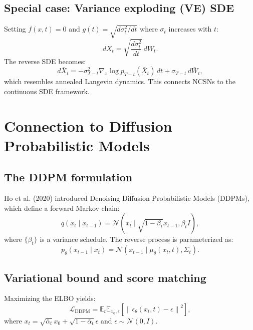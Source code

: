 \documentclass[11pt]{article}
\theoremstyle{definition}
\begin{document}
\subsection{Special case: Variance exploding (VE) SDE}
Setting $f(x,t) = 0$ and $g(t) = \sqrt{d\sigma_t^2/dt}$ where $\sigma_t$ increases with $t$:
\begin{equation}
dX_t = \sqrt{\frac{d\sigma_t^2}{dt}} \, dW_t.
\end{equation}
The reverse SDE becomes:
\begin{equation}
d\bar{X}_t = -\sigma_{T-t}^2 \nabla_x \log p_{T-t}(\bar{X}_t)\,dt + \sigma_{T-t}\, d\bar{W}_t,
\end{equation}
which resembles annealed Langevin dynamics. 
This connects NCSNs to the continuous SDE framework.

\section{Connection to Diffusion Probabilistic Models}

\subsection{The DDPM formulation}
Ho et al. (2020) introduced Denoising Diffusion Probabilistic Models (DDPMs), 
which define a forward Markov chain:
\begin{equation}
q(x_t \mid x_{t-1}) = \mathcal{N}(x_t \mid \sqrt{1-\beta_t}x_{t-1}, \beta_t I),
\end{equation}
where $\{\beta_t\}$ is a variance schedule. 
The reverse process is parameterized as:
\begin{equation}
p_\theta(x_{t-1} \mid x_t) = \mathcal{N}(x_{t-1} \mid \mu_\theta(x_t, t), \Sigma_t).
\end{equation}

\subsection{Variational bound and score matching}
Maximizing the ELBO yields:
\begin{equation}
\mathcal{L}_{\text{DDPM}}
= \mathbb{E}_t \mathbb{E}_{x_0, \epsilon}\left[\left\| \epsilon_\theta(x_t, t) - \epsilon \right\|^2\right],
\end{equation}
where $x_t = \sqrt{\bar{\alpha}_t} x_0 + \sqrt{1-\bar{\alpha}_t} \epsilon$ and $\epsilon \sim \mathcal{N}(0,I)$.
\end{document}
